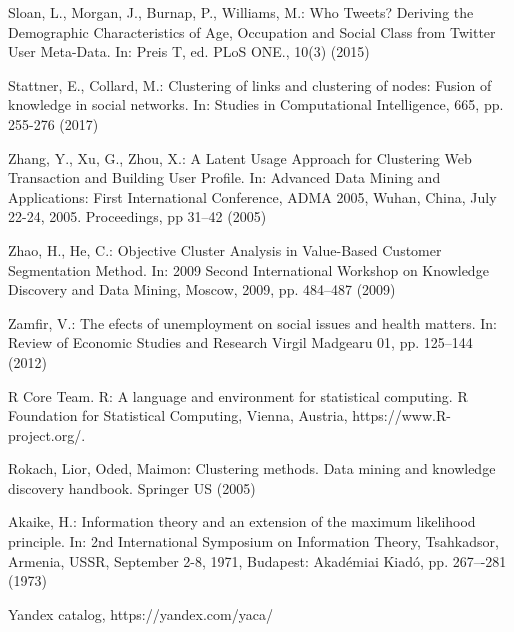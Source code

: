 \documentclass[runningheads,a4paper]{llncs}
\begin{document}
\begin{thebibliography}{4}


Sloan, L., Morgan, J., Burnap, P., Williams, M.: Who Tweets? Deriving the Demographic Characteristics of Age, Occupation and Social Class from Twitter User Meta-Data. In: Preis T, ed. PLoS ONE., 10(3) (2015)

Stattner, E., Collard, M.: Clustering of links and clustering of nodes: Fusion of knowledge in social networks. In: Studies in Computational Intelligence, 665, pp. 255-276 (2017)

Zhang, Y., Xu, G., Zhou, X.: A Latent Usage Approach for Clustering Web Transaction and Building User Profile. In: Advanced Data Mining and Applications: First International Conference, ADMA 2005, Wuhan, China, July 22-24, 2005. Proceedings, pp 31--42 (2005)

Zhao, H., He, C.: Objective Cluster Analysis in Value-Based Customer Segmentation Method. In: 2009 Second International Workshop on Knowledge Discovery and Data Mining, Moscow, 2009, pp. 484--487 (2009)

Zamfir, V.: The efects of unemployment on social issues and health matters. In: Review of Economic Studies and Research Virgil Madgearu 01, pp. 125--144 (2012)

 R Core Team. R: A language and environment for statistical computing. R Foundation for Statistical Computing, Vienna, Austria, https://www.R-project.org/.

 Rokach, Lior, Oded, Maimon: Clustering methods. Data mining and knowledge discovery handbook. Springer US (2005)

 Akaike, H.: Information theory and an extension of the maximum likelihood principle. In: 2nd International Symposium on Information Theory, Tsahkadsor, Armenia, USSR, September 2-8, 1971, Budapest: Akadémiai Kiadó, pp. 267–-281 (1973)

 Yandex catalog, https://yandex.com/yaca/



\end{thebibliography}
\end{document}
